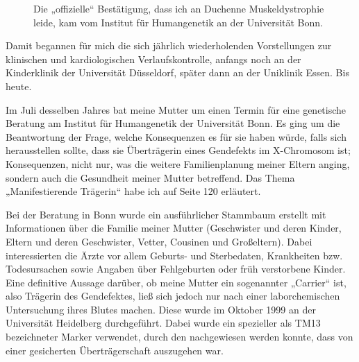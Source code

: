 \documentclass[fontsize=14pt,a4paper,headinclude,DIV=calc,automark]{scrbook}
\begin{document}
\setlength{\fboxsep}{0pt}    %
\setlength{\fboxrule}{0.2pt} %
\begin{figure}[H]
    \centering
    \caption{Die „offizielle“ Bestätigung, dass ich an Duchenne Muskeldystrophie leide, kam vom Institut für Humangenetik an der Universität Bonn.}
    \label{fig:befund_humangenetik}
\end{figure}

Damit begannen für mich die sich jährlich wiederholenden Vorstellungen zur klinischen und kardiologischen Verlaufskontrolle, anfangs noch an der Kinderklinik der Universität Düsseldorf, später dann an der Uniklinik Essen. Bis heute.

Im Juli desselben Jahres bat meine Mutter um einen Termin für eine genetische Beratung am Institut für Humangenetik der Universität Bonn. Es ging um die Beantwortung der Frage, welche Konsequenzen es für sie haben würde, falls sich herausstellen sollte, dass sie Überträgerin eines Gendefekts im X-Chromosom ist; Konsequenzen, nicht nur, was die weitere Familienplanung meiner Eltern anging, sondern auch die Gesundheit meiner Mutter betreffend. Das Thema „Manifestierende Trägerin“ habe ich auf Seite 120 erläutert.

Bei der Beratung in Bonn wurde ein ausführlicher Stammbaum erstellt mit Informationen über die Familie meiner Mutter (Geschwister und deren Kinder, Eltern und deren Geschwister, Vetter, Cousinen und Großeltern). Dabei interessierten die Ärzte vor allem Geburts- und Sterbedaten, Krankheiten bzw. Todesursachen sowie Angaben über Fehlgeburten oder früh verstorbene Kinder.
Eine definitive Aussage darüber, ob meine Mutter ein sogenannter „Carrier“ ist, also Trägerin des Gendefektes, ließ sich jedoch nur nach einer laborchemischen Untersuchung ihres Blutes machen. Diese wurde im Oktober 1999 an der Universität Heidelberg durchgeführt. Dabei wurde ein spezieller als TM13 bezeichneter Marker verwendet, durch den nachgewiesen werden konnte, dass von einer gesicherten Überträgerschaft auszugehen war.
\end{document}
